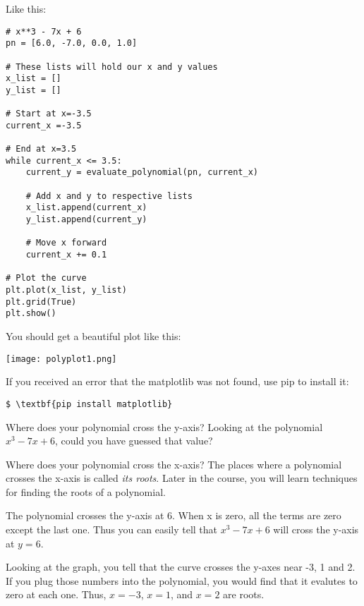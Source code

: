 Like this:
\begin{Verbatim}
# x**3 - 7x + 6
pn = [6.0, -7.0, 0.0, 1.0]

# These lists will hold our x and y values
x_list = []
y_list = []

# Start at x=-3.5
current_x =-3.5

# End at x=3.5
while current_x <= 3.5:
    current_y = evaluate_polynomial(pn, current_x)

    # Add x and y to respective lists
    x_list.append(current_x)
    y_list.append(current_y)

    # Move x forward
    current_x += 0.1

# Plot the curve
plt.plot(x_list, y_list)
plt.grid(True)
plt.show()
\end{Verbatim}

You should get a beautiful plot like this:

\texttt{[image: polyplot1.png]}

If you received an error that the matplotlib was not found, use pip to install it:
\begin{Verbatim}[commandchars=\\\{\}]
$ \textbf{pip install matplotlib}
\end{Verbatim}

\begin{Exercise}[title={Observations}, label=plotobservations]
  Where does your polynomial cross the y-axis? Looking at the
  polynomial $x^3 - 7x + 6$, could you have guessed that value?

  \vspace{20mm}
  
  Where does your polynomial cross the x-axis? The places where a
  polynomial crosses the x-axis is called \emph{its roots}. Later in
  the course, you will learn techniques for finding the roots of a
  polynomial.
\end{Exercise}
\begin{Answer}[ref=plotobservations]
  The polynomial crosses the y-axis at 6. When x is zero, all the terms are zero except the
  last one. Thus you can easily tell that $x^3 - 7x + 6$ will cross the y-axis at $y=6$.

  Looking at the graph, you tell that the curve crosses the y-axes
  near -3, 1 and 2. If you plug those numbers into the polynomial, you
  would find that it evalutes to zero at each one. Thus, $x=-3$, $x=1$, and $x=2$ are roots.
\end{Answer}
